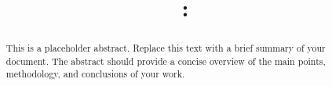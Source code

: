 \title{\textbf{\projectname:}\\\projectsubtitle}
\author{\authorteam}
\date{\documentdate}


\newcommand{\milestone}[1]{\textbf{\#1}}
\newcommand{\metric}[1]{\texttt{\#1}}

\newcommand{\risk}[1]{\textcolor{red}{\textbf{Risk:} #1}}
\newcommand{\mitigation}[1]{\textcolor{blue}{\textbf{Mitigation:} #1}}

\newcommand{\techterm}[1]{\textit{#1}}
\newcommand{\code}[1]{\texttt{#1}}

\newenvironment{techspec}
{\begin{quote}\textbf{Technical Specification:}}
{\end{quote}}

\newenvironment{implementation}
{\begin{quote}\textbf{Implementation Note:}}
{\end{quote}}


\hypersetup{
    colorlinks=true,
    linkcolor=black,
    filecolor=black,      
    urlcolor=cyan,
    citecolor=green,
    bookmarksnumbered=true,
    bookmarksopen=true,
    pdfstartview=FitH
}




\maketitle

\begin{abstract}
This is a placeholder abstract. Replace this text with a brief summary of your document. The abstract should provide a concise overview of the main points, methodology, and conclusions of your work.
\end{abstract}

